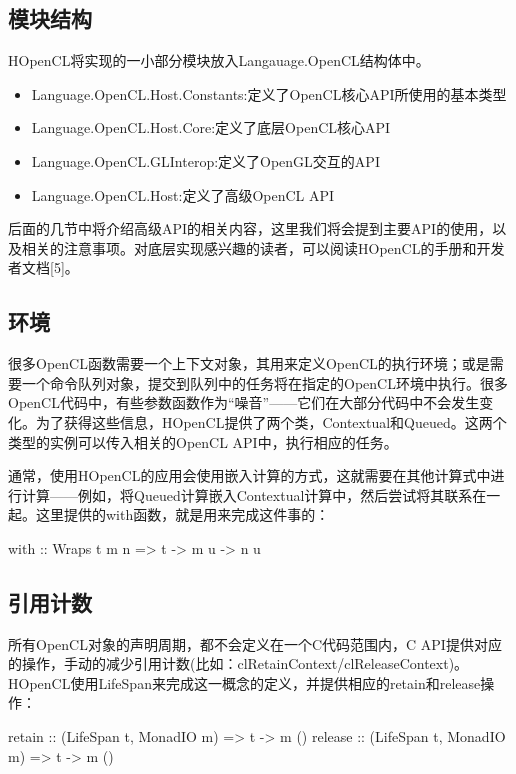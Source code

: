\subsection{模块结构}

HOpenCL将实现的一小部分模块放入Langauage.OpenCL结构体中。

\begin{itemize}
\item Language.OpenCL.Host.Constants:定义了OpenCL核心API所使用的基本类型
\item Language.OpenCL.Host.Core:定义了底层OpenCL核心API
\item Language.OpenCL.GLInterop:定义了OpenGL交互的API
\item Language.OpenCL.Host:定义了高级OpenCL API
\end{itemize}

后面的几节中将介绍高级API的相关内容，这里我们将会提到主要API的使用，以及相关的注意事项。对底层实现感兴趣的读者，可以阅读HOpenCL的手册和开发者文档[5]。

\subsection{环境}

很多OpenCL函数需要一个上下文对象，其用来定义OpenCL的执行环境；或是需要一个命令队列对象，提交到队列中的任务将在指定的OpenCL环境中执行。很多OpenCL代码中，有些参数函数作为“噪音”——它们在大部分代码中不会发生变化。为了获得这些信息，HOpenCL提供了两个类，Contextual和Queued。这两个类型的实例可以传入相关的OpenCL API中，执行相应的任务。

通常，使用HOpenCL的应用会使用嵌入计算的方式，这就需要在其他计算式中进行计算——例如，将Queued计算嵌入Contextual计算中，然后尝试将其联系在一起。这里提供的with函数，就是用来完成这件事的：

\begin{codebox}[haskell]
with :: Wraps t m n => t -> m u -> n u
\end{codebox}

\subsection{引用计数}

所有OpenCL对象的声明周期，都不会定义在一个C代码范围内，C API提供对应的操作，手动的减少引用计数(比如：clRetainContext/clReleaseContext)。HOpenCL使用LifeSpan来完成这一概念的定义，并提供相应的retain和release操作：

\begin{codebox}[haskell]
retain :: (LifeSpan t, MonadIO m) => t -> m ()
release :: (LifeSpan t, MonadIO m) => t -> m ()
\end{codebox}

